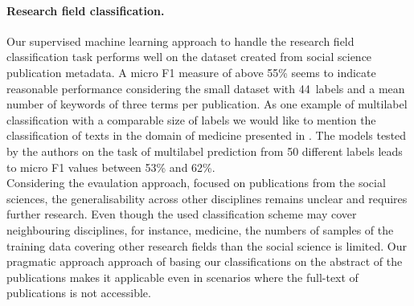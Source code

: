 \paragraph{Research field classification.}
Our supervised machine learning approach to handle the research field classification task performs well on the dataset created from social science publication metadata. A micro F1 measure of above 55\% seems to indicate reasonable performance considering the small dataset with 44~labels and a mean number of keywords of three terms per publication.
As one example of multilabel classification with a comparable size of labels we would like to mention the classification of texts in the domain of medicine presented in \cite{wang2018joint}.
The models tested by the authors on the task of multilabel prediction from 50 different labels leads to micro F1 values between 53\% and 62\%.\\
Considering the evaulation approach, focused on publications from the social sciences, the generalisability across other disciplines remains unclear and requires further research.
Even though the used classification scheme may cover neighbouring disciplines, for instance, medicine, the numbers of samples of the training data covering other research fields than the social science is limited.
Our pragmatic approach approach of basing our classifications on the abstract of the publications makes it applicable even in scenarios where the full-text of publications is not accessible. %


